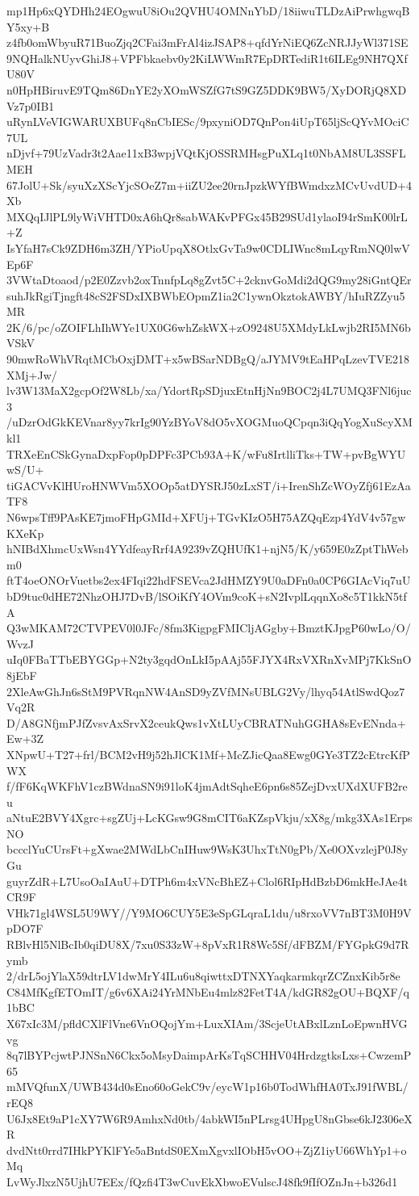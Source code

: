 mp1Hp6xQYDHh24EOgwuU8iOu2QVHU4OMNnYbD/18iiwuTLDzAiPrwhgwqBY5xy+B
z4fb0omWbyuR71BuoZjq2CFai3mFrAl4izJSAP8+qfdYrNiEQ6ZcNRJJyWl371SE
9NQHalkNUyvGhiJ8+VPFbkaebv0y2KiLWWmR7EpDRTediR1t6ILEg9NH7QXfU80V
n0HpHBiruvE9TQm86DnYE2yXOmWSZfG7tS9GZ5DDK9BW5/XyDORjQ8XDVz7p0IB1
uRynLVeVIGWARUXBUFq8nCbIESc/9pxyniOD7QnPon4iUpT65ljScQYvMOciC7UL
nDjvf+79UzVadr3t2Aae11xB3wpjVQtKjOSSRMHsgPuXLq1t0NbAM8UL3SSFLMEH
67JolU+Sk/syuXzXScYjcSOeZ7m+iiZU2ee20rnJpzkWYfBWmdxzMCvUvdUD+4Xb
MXQqIJlPL9lyWiVHTD0xA6hQr8sabWAKvPFGx45B29SUd1ylaoI94rSmK00lrL+Z
IsYfaH7sCk9ZDH6m3ZH/YPioUpqX8OtlxGvTa9w0CDLIWnc8mLqyRmNQ0lwVEp6F
3VWtaDtoaod/p2E0Zzvb2oxTnnfpLq8gZvt5C+2cknvGoMdi2dQG9my28iGntQEr
suhJkRgiTjngft48cS2FSDxIXBWbEOpmZ1ia2C1ywnOkztokAWBY/hIuRZZyu5MR
2K/6/pc/oZOIFLhIhWYe1UX0G6whZskWX+zO9248U5XMdyLkLwjb2RI5MN6bVSkV
90mwRoWhVRqtMCbOxjDMT+x5wBSarNDBgQ/aJYMV9tEaHPqLzevTVE218XMj+Jw/
lv3W13MaX2gcpOf2W8Lb/xa/YdortRpSDjuxEtnHjNn9BOC2j4L7UMQ3FNl6juc3
/uDzrOdGkKEVnar8yy7krIg90YzBYoV8dO5vXOGMuoQCpqn3iQqYogXuScyXMkl1
TRXeEnCSkGynaDxpFop0pDPFc3PCb93A+K/wFu8IrtlliTks+TW+pvBgWYUwS/U+
tiGACVvKlHUroHNWVm5XOOp5atDYSRJ50zLxST/i+IrenShZcWOyZfj61EzAaTF8
N6wpsTff9PAsKE7jmoFHpGMId+XFUj+TGvKIzO5H75AZQqEzp4YdV4v57gwKXeKp
hNIBdXhmcUxWsn4YYdfeayRrf4A9239vZQHUfK1+njN5/K/y659E0zZptThWebm0
ftT4oeONOrVuetbs2ex4FIqi22hdFSEVca2JdHMZY9U0aDFn0a0CP6GIAcViq7uU
bD9tuc0dHE72NhzOHJ7DvB/lSOiKfY4OVm9coK+sN2IvplLqqnXo8c5T1kkN5tfA
Q3wMKAM72CTVPEV0l0JFc/8fm3KigpgFMICljAGgby+BmztKJpgP60wLo/O/WvzJ
uIq0FBaTTbEBYGGp+N2ty3gqdOnLkI5pAAj55FJYX4RxVXRnXvMPj7KkSnO8jEbF
2XleAwGhJn6sStM9PVRqnNW4AnSD9yZVfMNsUBLG2Vy/lhyq54AtlSwdQoz7Vq2R
D/A8GNfjmPJfZvsvAxSrvX2ceukQws1vXtLUyCBRATNuhGGHA8sEvENnda+Ew+3Z
XNpwU+T27+frl/BCM2vH9j52hJlCK1Mf+McZJicQaa8Ewg0GYe3TZ2cEtrcKfPWX
f/fF6KqWKFhV1czBWdnaSN9i91loK4jmAdtSqheE6pn6s85ZejDvxUXdXUFB2reu
aNtuE2BVY4Xgrc+sgZUj+LcKGsw9G8mCIT6aKZspVkju/xX8g/mkg3XAs1ErpsNO
bccclYuCUrsFt+gXwae2MWdLbCnIHuw9WsK3UhxTtN0gPb/Xe0OXvzlejP0J8yGu
guyrZdR+L7UsoOaIAuU+DTPh6m4xVNcBhEZ+Clol6RIpHdBzbD6mkHeJAe4tCR9F
VHk71gl4WSL5U9WY//Y9MO6CUY5E3eSpGLqraL1du/u8rxoVV7nBT3M0H9VpDO7F
RBlvHl5NlBcIb0qiDU8X/7xu0S33zW+8pVxR1R8Wc5Sf/dFBZM/FYGpkG9d7Rymb
2/drL5ojYlaX59dtrLV1dwMrY4ILu6u8qiwttxDTNXYaqkarmkqrZCZnxKib5r8e
C84MfKgfETOmIT/g6v6XAi24YrMNbEu4mlz82FetT4A/kdGR82gOU+BQXF/q1bBC
X67xIc3M/pfldCXlFlVne6VnOQojYm+LuxXIAm/3ScjeUtABxlLznLoEpwnHVGvg
8q7lBYPcjwtPJNSnN6Ckx5oMsyDaimpArKsTqSCHHV04HrdzgtksLxs+CwzemP65
mMVQfunX/UWB434d0sEno60oGekC9v/eycW1p16b0TodWhfHA0TxJ91fWBL/rEQ8
U6Jx8Et9aP1cXY7W6R9AmhxNd0tb/4abkWI5nPLrsg4UHpgU8nGbse6kJ2306eXR
dvdNtt0rrd7IHkPYKlFYe5aBntdS0EXmXgvxlIObH5vOO+ZjZ1iyU66WhYp1+oMq
LvWyJlxzN5UjhU7EEx/fQzfi4T3wCuvEkXbwoEVulscJ48fk9fIfOZnJn+b326d1
